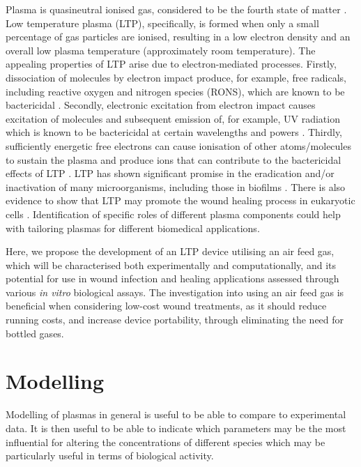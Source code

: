 \documentclass[11pt, oneside]{article}   	%
\begin{document}
Plasma is quasineutral ionised gas, considered to be the fourth state of matter \cite{Fridman2013plasmamedicine}.
Low temperature plasma (LTP), specifically, is formed when only a small percentage of gas particles are ionised, resulting in a low electron density and an overall low plasma temperature (approximately room temperature).
The appealing properties of LTP arise due to electron-mediated processes.
Firstly, dissociation of molecules by electron impact produce, for example, free radicals, including reactive oxygen and nitrogen species (RONS), which are known to be bactericidal \cite{Kong2009plasma}.
Secondly, electronic excitation from electron impact causes excitation of molecules and subsequent emission of, for example, UV radiation which is known to be bactericidal at certain wavelengths and powers \cite{Laroussi2004evaluation}.
Thirdly, sufficiently energetic free electrons can cause ionisation of other atoms/molecules to sustain the plasma and produce ions that can contribute to the bactericidal effects of LTP \cite{Mendis2000a, Laroussi2002nonthermal}.
LTP has shown significant promise in the eradication and/or inactivation of many microorganisms, including those in biofilms \cite{Laroussi2005low}. 
There is also evidence to show that LTP may promote the wound healing process in eukaryotic cells \cite{Haertel2014nonthermal, Kramer2013suitability}.
Identification of specific roles of different plasma components could help with tailoring plasmas for different biomedical applications.

Here, we propose the development of an LTP device utilising an air feed gas, which will be characterised both experimentally and computationally, and its potential for use in wound infection and healing applications assessed through various \textit{in vitro} biological assays.
The investigation into using an air feed gas is beneficial when considering low-cost wound treatments, as it should reduce running costs, and increase device portability, through eliminating the need for bottled gases.

\section{Modelling}
Modelling of plasmas in general is useful to be able to compare to experimental data. 
It is then useful to be able to indicate which parameters may be the most influential for altering the concentrations of different species which may be particularly useful in terms of biological activity.
\end{document}
